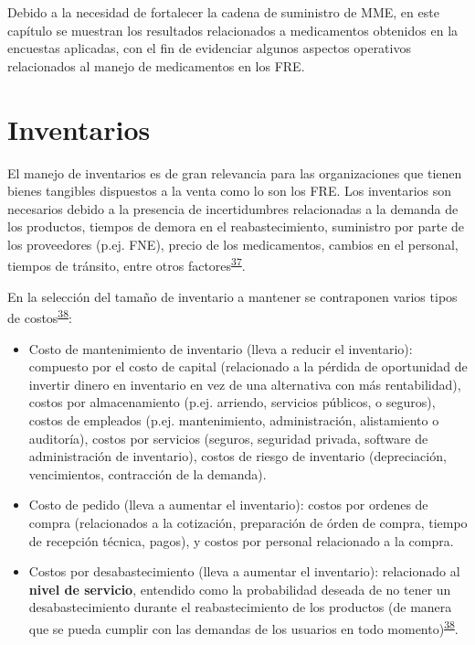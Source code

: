 \documentclass[
]{book}
\begin{document}
Debido a la necesidad de fortalecer la cadena de suministro de MME, en este capítulo se muestran los resultados relacionados a medicamentos obtenidos en la encuestas aplicadas, con el fin de evidenciar algunos aspectos operativos relacionados al manejo de medicamentos en los FRE.

\hypertarget{inventarios}{%
\section{Inventarios}\label{inventarios}}


El manejo de inventarios es de gran relevancia para las organizaciones que tienen bienes tangibles dispuestos a la venta como lo son los FRE. Los inventarios son necesarios debido a la presencia de incertidumbres relacionadas a la demanda de los productos, tiempos de demora en el reabastecimiento, suministro por parte de los proveedores (p.ej. FNE), precio de los medicamentos, cambios en el personal, tiempos de tránsito, entre otros factores\textsuperscript{\protect\hyperlink{ref-Nahmias2007}{37}}.

En la selección del tamaño de inventario a mantener se contraponen varios tipos de costos\textsuperscript{\protect\hyperlink{ref-Krajewski2016}{38}}:

\begin{itemize}
\item
  Costo de mantenimiento de inventario (lleva a reducir el inventario): compuesto por el costo de capital (relacionado a la pérdida de oportunidad de invertir dinero en inventario en vez de una alternativa con más rentabilidad), costos por almacenamiento (p.ej. arriendo, servicios públicos, o seguros), costos de empleados (p.ej. mantenimiento, administración, alistamiento o auditoría), costos por servicios (seguros, seguridad privada, software de administración de inventario), costos de riesgo de inventario (depreciación, vencimientos, contracción de la demanda).
\item
  Costo de pedido (lleva a aumentar el inventario): costos por ordenes de compra (relacionados a la cotización, preparación de órden de compra, tiempo de recepción técnica, pagos), y costos por personal relacionado a la compra.
\item
  Costos por desabastecimiento (lleva a aumentar el inventario): relacionado al \textbf{nivel de servicio}, entendido como la probabilidad deseada de no tener un desabastecimiento durante el reabastecimiento de los productos (de manera que se pueda cumplir con las demandas de los usuarios en todo momento)\textsuperscript{\protect\hyperlink{ref-Krajewski2016}{38}}.
\end{itemize}
\end{document}
